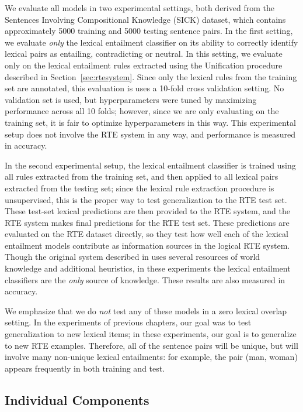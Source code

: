 We evaluate all models in two experimental settings, both derived from the
Sentences Involving Compositional Knowledge (SICK) dataset, which contains
approximately 5000 training and 5000 testing sentence pairs. In the first
setting, we evaluate {\em only} the lexical entailment classifier on its
ability to correctly identify lexical pairs as entailing, contradicting or
neutral. In this setting, we evaluate only on the lexical entailment rules
extracted using the Unification procedure described in
Section~\ref{sec:rtesystem}. Since only the lexical rules from the training set
are annotated, this evaluation is uses a 10-fold cross validation setting.  No
validation set is used, but hyperparameters were tuned by maximizing
performance across all 10 folds; however, since we are only evaluating on the
training set, it is fair to optimize hyperparameters in this way. This
experimental setup does not involve the RTE system in any way, and performance
is measured in accuracy.

In the second experimental setup, the lexical entailment classifier is trained
using all rules extracted from the training set, and then applied to all
lexical pairs extracted from the testing set; since the lexical rule extraction
procedure is unsupervised, this is the proper way to test generalization to the
RTE test set. These test-set lexical predictions are then provided to the RTE
system, and the RTE system makes final predictions for the RTE test set. These
predictions are evaluated on the RTE dataset directly, so they test how well
each of the lexical entailment models contribute as information sources in the
logical RTE system. Though the original system described in
 uses several resources of world knowledge and
additional heuristics, in these
experiments the lexical entailment classifiers are the {\em only} source of
knowledge. These results are also measured in accuracy.

We emphasize that we do {\em not} test any of these models
in a zero lexical overlap setting. In the experiments of previous chapters, our
goal was to test generalization to new lexical items; in these experiments, our
goal is to generalize to new RTE examples. Therefore, all of the sentence pairs
will be unique, but will involve many non-unique lexical entailments: for
example, the pair (man, woman) appears frequently in both training and test.

\subsection{Individual Components}


